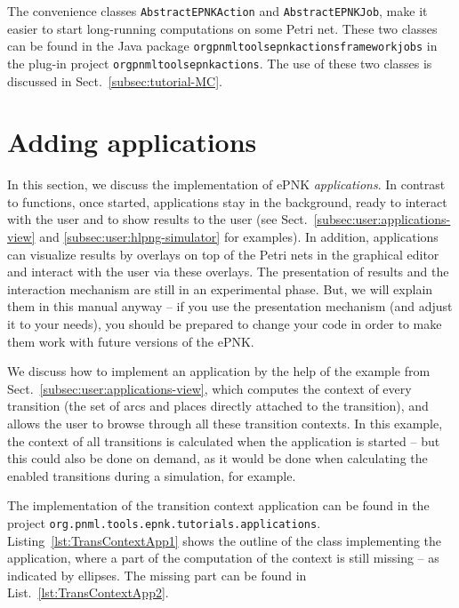 The convenience classes {\tt AbstractEPNKAction}%
and {\tt AbstractEPNKJob},%
make it easier to start long-running computations on some Petri net. These
two classes can be found in the Java package
{\tt org\qnsep{}pnml\qnsep{}tools\qnsep{}epnk\qnsep{}actions\qnsep{}framework\qnsep{}jobs}
in the plug-in project
{\tt org\qnsep{}pnml\qnsep{}tools\qnsep{}epnk\qnsep{}actions}.
The use of these two classes is discussed in Sect.~\ref{subsec:tutorial-MC}.%

\section{Adding applications}
\label{subsec:developer:applications}

In this section, we discuss the implementation of ePNK \emph{applications}.
In contrast to functions, once started, applications stay in the background,
ready to interact with the user and to show results to the user
(see Sect.~\ref{subsec:user:applications-view} and \ref{subsec:user:hlpng-simulator}
for examples). In addition, applications can visualize results by overlays
on top of the Petri nets in the graphical editor and interact with the user
via these overlays.
The presentation of results and the interaction mechanism are still
in an experimental phase. But, we will explain them in this manual anyway --
if you use the presentation mechanism (and adjust it to your needs), you
should be prepared to change your code in order to make them work with future
versions of the ePNK.

We discuss how to implement an application by the help of the
example from Sect.~\ref{subsec:user:applications-view}, which computes the
context of every transition (the set of arcs and places directly attached to the
transition), and allows the user to browse through all these transition
contexts. In this example, the context of all transitions is calculated when the
application is started -- but this could also be done on demand, as it would be
done when calculating the enabled transitions during a simulation, for example.

The implementation of the transition context application can be found
in the project {\tt org.pnml.tools.epnk.tutorials.applications}.
Listing~\ref{lst:TransContextApp1} shows the outline of the class implementing
the application, where a part of the computation of the context is still missing
-- as indicated by ellipses. The missing part can be found in
List.~\ref{lst:TransContextApp2}.

